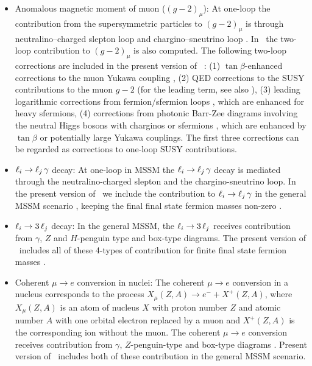 \documentclass[preprint,3p,12pt]{elsarticle}
\begin{document}
\begin{itemize}
	\item Anomalous magnetic moment of muon ($(g-2)_{\mu}$): At one-loop the contribution from the supersymmetric particles to $(g-2)_{\mu}$ is through neutralino--charged slepton loop and chargino--sneutrino loop \cite{Chattopadhyay:1995ae,Moroi:1995yh,Hisano:1995cp}. In \hf\ the two-loop contribution to $(g-2)_{\mu}$ is also computed. The following two-loop corrections  are included in the present version of \hf\ :
		(1) $\tan\beta$-enhanced corrections to the muon Yukawa coupling \cite{Marchetti:2008hw},
		(2) QED corrections to the SUSY contributions to the muon $g-2$ \cite{vonWeitershausen:2010zr} (for the leading term, see also \cite{Degrassi:1998es}),
		(3) leading logarithmic corrections from fermion/sfermion loops \cite{Fargnoli:2013zia}, which are enhanced for heavy sfermions,
		(4) corrections from photonic Barr-Zee diagrams involving the neutral Higgs bosons with charginos or sfermions \cite{Stockinger:2006zn}, which are enhanced by $\tan\beta$ or potentially large Yukawa couplings.
		The first three corrections can be regarded as corrections to one-loop SUSY contributions.
	\item $\ell_i \to \ell_j\, \gamma$ decay: At one-loop in MSSM the $\ell_i \to \ell_j\, \gamma$ decay is mediated through the neutralino-charged slepton and the chargino-sneutrino loop. In the present version of \hf\ we include the contribution to $\ell_i \to \ell_j\, \gamma$ in the general MSSM scenario \cite{Hisano:1995cp}, keeping the final final state fermion masses non-zero \cite{Arganda:2005ji}.
	\item $\ell_i \to 3\, \ell_j$ decay: In the general MSSM, the $\ell_i \to 3\, \ell_j$ receives contribution from $\gamma$, $Z$ and $H$-penguin type and box-type diagrams. The present version of \hf\ includes all of these 4-types of contribution for finite final state fermion masses \cite{Hisano:1995cp,Arganda:2005ji}. 
	\item Coherent $\mu \to e$ conversion in nuclei: The coherent $\mu \to e$ conversion in a nucleus corresponds to the process $X_{\mu}(Z,A) \to e^{-} + X^{+}(Z,A)$, where $X_{\mu}(Z,A)$ is an atom of nucleus $X$ with proton number $Z$ and atomic number $A$ with one orbital electron replaced by a muon and $X^{+}(Z,A)$ is the corresponding ion without the muon. The coherent $\mu \to e$ conversion receives contribution from $\gamma$, $Z$-penguin-type and box-type diagrams \cite{Hisano:1995cp}. Present version of \hf\ includes both of these contribution in the general MSSM scenario.  
\end{itemize}
\end{document}
